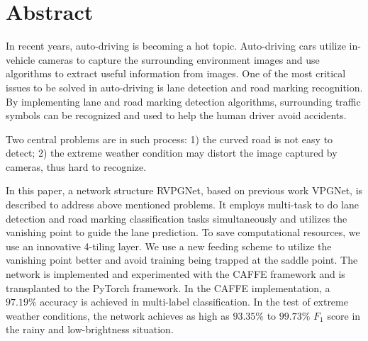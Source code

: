 \newpage
{}
\chapter*{\centering Abstract}
\begin{spacing}{1.5}
\setlength{\parskip}{0.3in}
\thispagestyle{addin}

In recent years, auto-driving is becoming a hot topic. Auto-driving cars utilize in-vehicle cameras to capture the surrounding environment images and use algorithms to extract useful information from images. One of the most critical issues to be solved in auto-driving is lane detection and road marking recognition. By implementing lane and road marking detection algorithms, surrounding traffic symbols can be recognized and used to help the human driver avoid accidents. 

Two central problems are in such process: 1) the curved road is not easy to detect; 2) the extreme weather condition may distort the image captured by cameras, thus hard to recognize.

In this paper, a network structure RVPGNet, based on previous work VPGNet, is described to address above mentioned problems. It employs multi-task to do lane detection and road marking classification tasks simultaneously and utilizes the vanishing point to guide the lane prediction. To save computational resources, we use an innovative 4-tiling layer. We use a new feeding scheme to utilize the vanishing point better and avoid training being trapped at the saddle point. The network is implemented and experimented with the CAFFE framework and is transplanted to the PyTorch framework. In the CAFFE implementation, a $97.19\%$ accuracy is achieved in multi-label classification. In the test of extreme weather conditions, the network achieves as high as $93.35\%$ to $99.73\%$ $F_1$ score in the rainy and low-brightness situation.


\end{spacing}
\newpage
